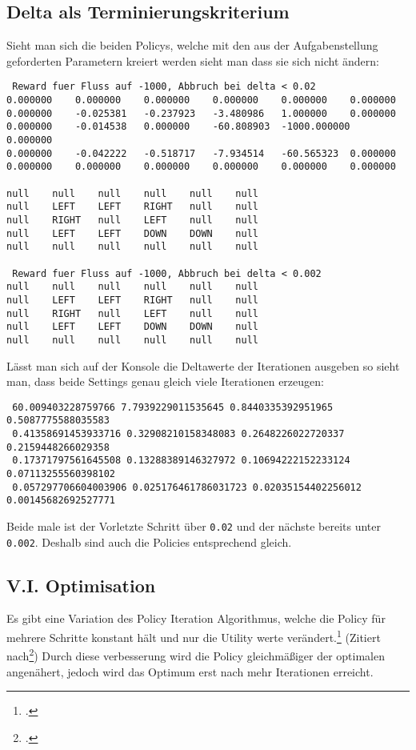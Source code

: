 \documentclass[a4paper]{article}
\begin{document}
\subsection{Delta als Terminierungskriterium}
Sieht man sich die beiden Policys, welche mit den aus der Aufgabenstellung geforderten Parametern kreiert werden sieht man dass sie sich nicht ändern:
\begin{lstlisting}
 Reward fuer Fluss auf -1000, Abbruch bei delta < 0.02
0.000000 	0.000000 	0.000000 	0.000000 	0.000000 	0.000000 	
0.000000 	-0.025381 	-0.237923 	-3.480986 	1.000000 	0.000000 	
0.000000 	-0.014538 	0.000000 	-60.808903 	-1000.000000 	0.000000 	
0.000000 	-0.042222 	-0.518717 	-7.934514 	-60.565323 	0.000000 	
0.000000 	0.000000 	0.000000 	0.000000 	0.000000 	0.000000 	

null	null	null	null	null	null	
null	LEFT	LEFT	RIGHT	null	null	
null	RIGHT	null	LEFT	null	null	
null	LEFT	LEFT	DOWN	DOWN	null	
null	null	null	null	null	null	

 Reward fuer Fluss auf -1000, Abbruch bei delta < 0.002
null	null	null	null	null	null	
null	LEFT	LEFT	RIGHT	null	null	
null	RIGHT	null	LEFT	null	null	
null	LEFT	LEFT	DOWN	DOWN	null	
null	null	null	null	null	null	

\end{lstlisting}
Lässt man sich auf der Konsole die Deltawerte der Iterationen ausgeben so sieht man, dass beide Settings genau gleich viele Iterationen erzeugen:
\begin{lstlisting}
 60.009403228759766 7.7939229011535645 0.8440335392951965 0.5087775588035583
 0.41358691453933716 0.32908210158348083 0.2648226022720337 0.2159448266029358
 0.17371797561645508 0.13288389146327972 0.10694222152233124 0.07113255560398102
 0.057297706604003906 0.025176461786031723 0.02035154402256012 0.00145682692527771
\end{lstlisting}

Beide male ist der Vorletzte Schritt über \texttt{0.02} und der nächste bereits unter \texttt{0.002}. Deshalb sind auch die Policies entsprechend gleich.
\lstset{numbers=left}

\subsection{V.I. Optimisation}
Es gibt eine Variation des Policy Iteration Algorithmus, welche die Policy für mehrere Schritte konstant hält und nur die Utility werte verändert.\footcite{
Martin L. Puterman and Moon Chirl Shin. Modified policy iteration algorithms for discounted Markov decision processes. Management Science, 24:1127-1137, 1978.}
(Zitiert nach\footcite{https://www.cs.cmu.edu/afs/cs/project/jair/pub/volume4/kaelbling96a-html/node21.html}) Durch diese verbesserung wird die Policy gleichmäßiger der optimalen angenähert, jedoch wird das Optimum erst nach mehr Iterationen erreicht.\\
\end{document}
